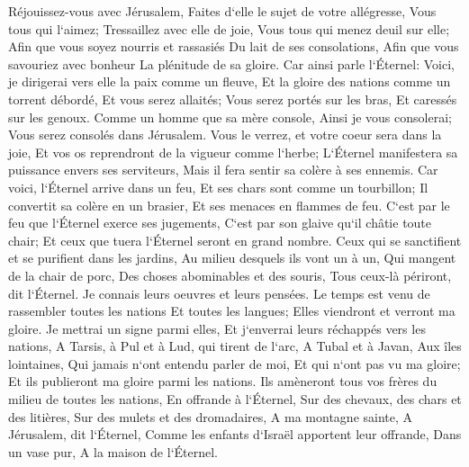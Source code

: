 \verse Réjouissez-vous avec Jérusalem, Faites d`elle le sujet de votre allégresse, Vous tous qui l`aimez; Tressaillez avec elle de joie, Vous tous qui menez deuil sur elle; 
\verse Afin que vous soyez nourris et rassasiés Du lait de ses consolations, Afin que vous savouriez avec bonheur La plénitude de sa gloire. 
\verse Car ainsi parle l`Éternel: Voici, je dirigerai vers elle la paix comme un fleuve, Et la gloire des nations comme un torrent débordé, Et vous serez allaités; Vous serez portés sur les bras, Et caressés sur les genoux. 
\verse Comme un homme que sa mère console, Ainsi je vous consolerai; Vous serez consolés dans Jérusalem. 
\verse Vous le verrez, et votre coeur sera dans la joie, Et vos os reprendront de la vigueur comme l`herbe; L`Éternel manifestera sa puissance envers ses serviteurs, Mais il fera sentir sa colère à ses ennemis. 
\verse Car voici, l`Éternel arrive dans un feu, Et ses chars sont comme un tourbillon; Il convertit sa colère en un brasier, Et ses menaces en flammes de feu. 
\verse C`est par le feu que l`Éternel exerce ses jugements, C`est par son glaive qu`il châtie toute chair; Et ceux que tuera l`Éternel seront en grand nombre. 
\verse Ceux qui se sanctifient et se purifient dans les jardins, Au milieu desquels ils vont un à un, Qui mangent de la chair de porc, Des choses abominables et des souris, Tous ceux-là périront, dit l`Éternel. 
\verse Je connais leurs oeuvres et leurs pensées. Le temps est venu de rassembler toutes les nations Et toutes les langues; Elles viendront et verront ma gloire. 
\verse Je mettrai un signe parmi elles, Et j`enverrai leurs réchappés vers les nations, A Tarsis, à Pul et à Lud, qui tirent de l`arc, A Tubal et à Javan, Aux îles lointaines, Qui jamais n`ont entendu parler de moi, Et qui n`ont pas vu ma gloire; Et ils publieront ma gloire parmi les nations. 
\verse Ils amèneront tous vos frères du milieu de toutes les nations, En offrande à l`Éternel, Sur des chevaux, des chars et des litières, Sur des mulets et des dromadaires, A ma montagne sainte, A Jérusalem, dit l`Éternel, Comme les enfants d`Israël apportent leur offrande, Dans un vase pur, A la maison de l`Éternel. 
